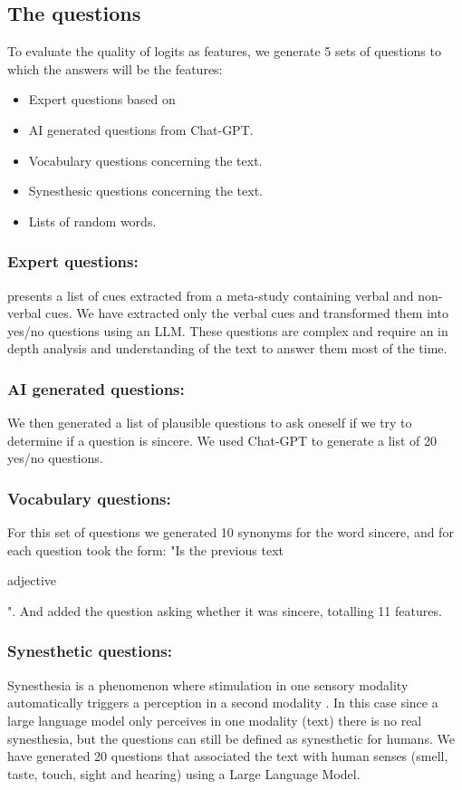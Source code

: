 \documentclass[11pt]{article}
\begin{document}
\subsection{The questions}
To evaluate the quality of logits as features, we generate 5 sets of questions to which the answers will be the features:

\begin{itemize}
    \item Expert questions based on \cite{depauloCuesDeception2003}
    \item AI generated questions from Chat-GPT.
    \item Vocabulary questions concerning the text.
    \item Synesthesic questions concerning the text.
    \item Lists of random words.
\end{itemize}

\subsubsection{Expert questions:}
\cite{depauloCuesDeception2003} presents a list of cues extracted from a meta-study containing verbal and non-verbal cues. We have extracted only the verbal cues and transformed them into yes/no questions using an LLM. 
These questions are complex and require an in depth analysis and understanding of the text to answer them most of the time. 

\subsubsection{AI generated questions:}
We then generated a list of plausible questions to ask oneself if we try to determine if a question is sincere. We used Chat-GPT to generate a list of 20 yes/no questions. 

\subsubsection{Vocabulary questions:}
For this set of questions we generated 10 synonyms for the word sincere, and for each question took the form: "Is the previous text \begin{it} adjective \end{it}". And added the question asking whether it was sincere, totalling 11 features.

\subsubsection{Synesthetic questions:}
Synesthesia is a phenomenon where stimulation in one sensory modality automatically triggers a perception in a second modality \citep{cytowicSynesthesiaUnionSenses2002}. In this case since a large language model only perceives in one modality (text) there is no real synesthesia, but the questions can still be defined as synesthetic for humans. 
We have generated 20 questions that associated the text with human senses (smell, taste, touch, sight and hearing) using a Large Language Model. 
\end{document}
